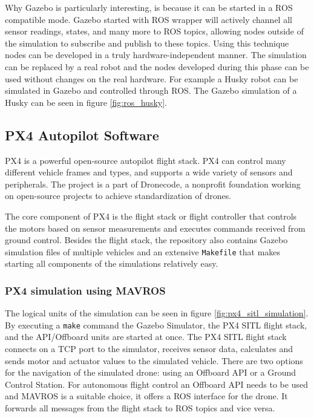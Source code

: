 Why Gazebo is particularly interesting, is because it can be started in a ROS compatible mode. Gazebo
started with ROS wrapper will actively channel all sensor readings, states, and many more to ROS topics, 
allowing nodes outside of the simulation to subscribe and publish to these topics. Using this technique nodes 
can be developed in a truly hardware-independent manner. The simulation can be replaced by a real robot
and the nodes developed during this phase can be used without changes on the real hardware. For example a 
Husky robot can be simulated in Gazebo and controlled through ROS. The Gazebo simulation of a Husky 
can be seen in figure \ref{fig:ros_husky}.


\subsection{PX4 Autopilot Software}
PX4 is a powerful open-source autopilot flight stack. PX4 can control many different vehicle frames and 
types, and supports a wide variety of sensors and peripherals. The project is a part of Dronecode, a nonprofit
foundation working on open-source projects to achieve standardization of drones.\cite{PX4Website} 

The core component of PX4 is the flight stack or flight controller that controls the motors based on sensor
measurements and executes commands received from ground control. Besides the flight stack, the repository 
also contains Gazebo simulation files of multiple vehicles and an extensive \verb|Makefile| that makes 
starting all components of the simulations relatively easy. 

\subsubsection{PX4 simulation using MAVROS}
The logical units of the simulation can be seen in figure \ref{fig:px4_sitl_simulation}.
By executing a \verb|make| command the Gazebo Simulator, the PX4 SITL flight stack, and the API/Offboard units
are started at once. The PX4 SITL flight stack connects on a TCP port to the simulator, receives sensor data, 
calculates and sends motor and actuator values to the simulated vehicle. There are two options for the navigation
of the simulated drone: using an Offboard API or a Ground Control Station. For autonomous flight control an 
Offboard API needs to be used and MAVROS is a suitable choice, it offers a ROS interface for 
the drone. It forwards all messages from the flight stack to ROS topics and vice versa.

